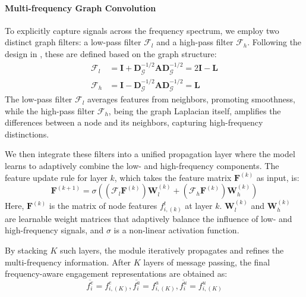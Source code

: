 \documentclass[runningheads]{llncs}
\begin{document}
\paragraph{\textbf{Multi-frequency Graph Convolution}}
To explicitly capture signals across the frequency spectrum, we employ two distinct graph filters: a low-pass filter $\mathcal{F}_l$ and a high-pass filter $\mathcal{F}_h$. Following the design in \cite{bo2021beyond}, these are defined based on the graph structure:
\begin{equation}\label{eq:e11}
	\begin{aligned} 
		\mathcal{F}_l &= \mathbf{I} + \mathbf{D}_{\mathcal{G}}^{-1/2}\mathbf{A} \mathbf{D}_{\mathcal{G}}^{-1/2} = 2\mathbf{I} - \mathbf{L} \\
		\mathcal{F}_h &= \mathbf{I} - \mathbf{D}_{\mathcal{G}}^{-1/2}\mathbf{A} \mathbf{D}_{\mathcal{G}}^{-1/2} = \mathbf{L}
	\end{aligned}
\end{equation}
The low-pass filter $\mathcal{F}_l$ averages features from neighbors, promoting smoothness, while the high-pass filter $\mathcal{F}_h$, being the graph Laplacian itself, amplifies the differences between a node and its neighbors, capturing high-frequency distinctions.

We then integrate these filters into a unified propagation layer where the model learns to adaptively combine the low- and high-frequency components. The feature update rule for layer $k$, which takes the feature matrix $\mathbf{F}^{(k)}$ as input, is:
\begin{equation}\label{eq:e12}
	\mathbf{F}^{(k+1)} = \sigma \left( (\mathcal{F}_l \mathbf{F}^{(k)}) \mathbf{W}_{l}^{(k)} + (\mathcal{F}_h \mathbf{F}^{(k)}) \mathbf{W}_{h}^{(k)} \right)
\end{equation}
\noindent Here, $\mathbf{F}^{(k)}$ is the matrix of node features $f_{i,(k)}^t$ at layer $k$. $\mathbf{W}_{l}^{(k)}$ and $\mathbf{W}_{h}^{(k)}$ are learnable weight matrices that adaptively balance the influence of low- and high-frequency signals, and $\sigma$ is a non-linear activation function.

By stacking $K$ such layers, the module iteratively propagates and refines the multi-frequency information. After $K$ layers of message passing, the final frequency-aware engagement representations are obtained as:
\begin{equation}\label{eq:e13}
	\overline{f_{i}^e}=f_{i,(K)}^e, \overline{f_{i}^a}=f_{i,(K)}^a, \overline{f_{i}^u}=f_{i,(K)}^u
\end{equation}
\end{document}
